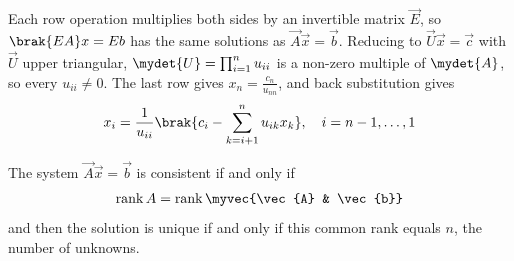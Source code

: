 \begin{enumerate}[label=\thesubsection.\arabic*, ref=\thesubsection.\theenumi]
Each row operation multiplies both sides by an invertible matrix $\vec{E}$, so $\brak{\vec{E}\vec{A}}\vec{x} = \vec{E}\vec{b}$ has the same solutions as $\vec{A}\vec{x} = \vec{b}$. Reducing to $\vec{U}\vec{x} = \vec{c}$ with $\vec{U}$ upper triangular, $\mydet{\vec{U}} = \prod_{i=1}^{n}u_{ii}$ is a non-zero multiple of $\mydet{\vec{A}}$, so every $u_{ii} \neq 0$. The last row gives $x_n = \frac{c_n}{u_{nn}}$, and back substitution gives
\begin{align}
	x_i = \frac{1}{u_{ii}}\brak{c_i - \sum_{k=i+1}^{n}u_{ik}x_k}, \quad i = n-1,\dots,1
\end{align}

\smallskip
The system $\vec{A}\vec{x} = \vec{b}$ is consistent if and only if
\begin{align}
	\operatorname{rank}\vec{A} = \operatorname{rank}\myvec{\vec{A} & \vec{b}} \label{eq:EE26BTECH11205-rank-thm}
\end{align}
and then the solution is unique if and only if this common rank equals $n$, the number of unknowns.


\end{enumerate}
